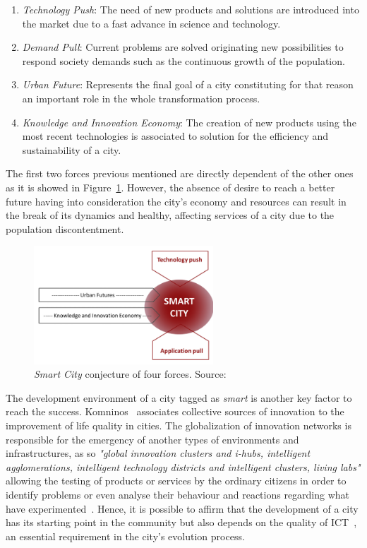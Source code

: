 \begin{enumerate}
	\item \textit{Technology Push}: The need of new products and solutions are introduced into the market due to a fast advance in science and technology.
	\item \textit{Demand Pull}: Current problems are solved originating new possibilities to respond society demands such as the continuous growth of the population.
	\item \textit{Urban Future}: Represents the final goal of a city constituting for that reason an important role in the whole transformation process.
	\item \textit{Knowledge and Innovation Economy}: The creation of new products using the most recent technologies is associated to solution for the efficiency and sustainability of a city.
\end{enumerate}

The first two forces previous mentioned are directly dependent of the other ones as it is showed in Figure~\ref{fig:four_forces}. However, the absence of desire to reach a better future having into consideration the city's economy and resources can result in the break of its dynamics and healthy, affecting services of a city due to the population discontentment.

\begin{figure}
	\centering
	\includegraphics[width=0.6\textwidth]{figures/four_forces.png}
	\caption{\textit{Smart City} conjecture of four forces. Source:~\cite{kn:Angelidou2015}}
	\label{fig:four_forces}
\end{figure}

The development environment of a city tagged as \textit{smart} is another key factor to reach the success. Komninos~\cite{kn:Komninos2009} associates collective sources of innovation to the improvement of life quality in cities. The globalization of innovation networks is responsible for the emergency of another types of environments and infrastructures, as so \emph{"global innovation clusters and i-hubs, intelligent agglomerations, intelligent technology districts and intelligent clusters, living labs"} allowing the testing of products or services by the ordinary citizens in order to identify problems or even analyse their behaviour  and reactions regarding what have experimented~\cite{kn:Komninos2009}. Hence, it is possible to affirm that the development of a city has its starting point in the community but also depends on the quality of \gls{ICT}~\cite{hollands2008will}, an essential requirement in the city's evolution process.

